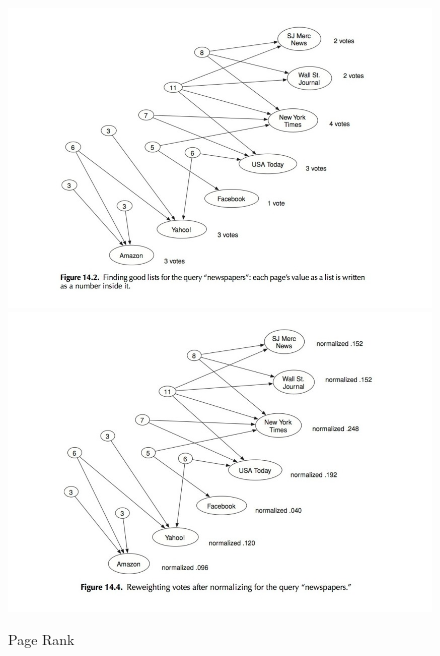 \begin{figure}
\centering
\includegraphics[scale=0.5]{images/ref/fig-14-2.jpeg}
\includegraphics[scale=0.5]{images/ref/fig-14-4.jpeg}
\caption{Page Rank}
\label{pageRankNews1}
\end{figure}

